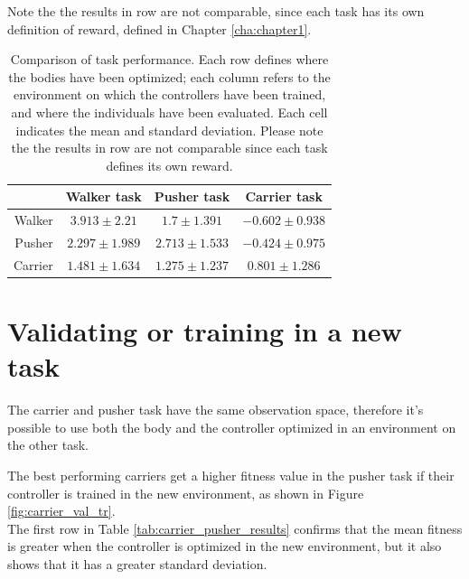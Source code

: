 Note the the results in row are not comparable, since each task has its own definition of reward, defined in Chapter \ref{cha:chapter1}.

\begin{table}[h]
    \centering
    \begin{tabular}{r|c|c|c|}
         & Walker task & Pusher task & Carrier task \\
         \hline
        Walker & $3.913 \pm 2.21$ & $ 1.7\pm1.391 $ & $-0.602 \pm 0.938$\\
        Pusher & $  2.297\pm1.989 $ & $2.713 \pm 1.533$ & $-0.424 \pm 0.975$ \\
        Carrier & $ 1.481\pm1.634 $ & $ 1.275\pm1.237 $ & $0.801 \pm 1.286$ \\
        \hline
    \end{tabular}
    \caption{Comparison of task performance.
    Each row defines where the bodies have been optimized; each column refers to the environment on which the controllers have been trained, and where the individuals have been evaluated.
    Each cell indicates the mean and standard deviation.
    Please note the the results in row are not comparable since each task defines its own reward.}
    \label{tab:results}
\end{table}



\section{Validating or training in a new task}
The carrier and pusher task have the same observation space, therefore it's possible to use both the body and the controller optimized in an environment on the other task.

The best performing carriers get a higher fitness value in the pusher task if their controller is trained in the new environment, as shown in Figure \ref{fig:carrier_val_tr}.\\
The first row in Table \ref{tab:carrier_pusher_results} confirms that the mean fitness is greater when the controller is optimized in the new environment, but it also shows that it has a greater standard deviation.

